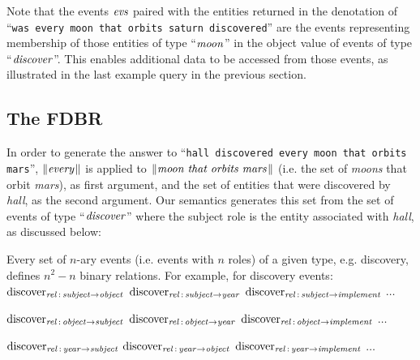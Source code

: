 \documentclass[../main.tex]{subfiles}
\begin{document}
\begin{refsection}
Note that the events $\evs$ paired with the entities returned in the denotation of ``\texttt{was every moon that orbits saturn discovered}'' are the events representing membership of those entities of type ``$\opit{moon}$'' in the object value of events of type ``$\opit{discover}$''. This enables additional data to be accessed from those events, as illustrated in the last example query in the previous section.

\subsection{The FDBR}

In order to generate the  answer to ``\texttt{hall discovered every moon that orbits mars}'', $\meaningof{every}$ is applied to $\meaningof{moon\ that\ orbits\ mars}$ (i.e. the set of \textit{moons} that orbit \textit{mars}), as first argument, and  the set of entities  that were discovered by \textit{hall}, as the second argument. Our semantics generates this set from the set of events of type ``$\opit{discover}$'' where the subject role is the entity associated with \textit{hall}, as discussed below:

\noindent Every set of $n$-ary events (i.e. events with $n$ roles) of a given type, e.g. discovery, defines $n^2 - n$ binary relations. For example, for discovery events: \\

\noindent $\relationn{discover}{subject}{object}$ $\relationn{discover}{subject}{year}$ $\relationn{discover}{subject}{implement}$ $\dots$

\noindent $\relationn{discover}{object}{subject}$ $\relationn{discover}{object}{year}$ $\relationn{discover}{object}{implement}$ $\dots$

\noindent $\relationn{discover}{year}{subject}$ $\relationn{discover}{year}{object}$ $\relationn{discover}{year}{implement}$ $\dots$ \\


\end{refsection}
\end{document}
